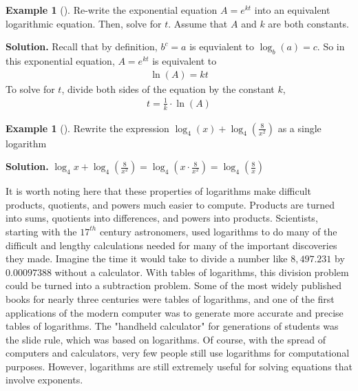 \documentclass[10pt,]{book}
\theoremstyle{plain}
\theoremstyle{definition}
\theoremstyle{definition}
\newtheorem{example}[theorem]{Example}
\theoremstyle{definition}
\numberwithin{equation}{section}
\begin{document}
\begin{example}[]\label{example-22}
\hypertarget{p-292}{}%
Re-write the exponential equation \(A = e^{kt}\) into an equivalent logarithmic equation. Then, solve for \(t\). Assume that \(A\) and \(k\) are both constants.%
\par\smallskip%
\noindent\textbf{Solution.}\hypertarget{solution-22}{}\quad%
\hypertarget{p-293}{}%
Recall that by definition, \(b ^ c = a\) is equvialent to \(\log_b(a) = c\). So in this exponential equation, \(A = e^{kt}\) is equivalent to%
\begin{gather*}
\ln \left( A \right) = kt
\end{gather*}
To solve for \(t\), divide both sides of the equation by the constant \(k\),%
\begin{gather*}
t = \frac{1}{k} \cdot \ln \left( A \right)
\end{gather*}
%
\end{example}
\begin{example}[]\label{example-23}
\hypertarget{p-294}{}%
Rewrite the expression \(\log_4(x) + \log_4 \left( \frac{8}{x^2} \right)\) as a single logarithm%
\par\smallskip%
\noindent\textbf{Solution.}\hypertarget{solution-23}{}\quad%
\hypertarget{p-295}{}%
\(\log_4 x + \log_4 \left( \frac{8}{x^2} \right) = \log_4 \left( x \cdot \frac{8}{x^2} \right) = \log_4 \left( \frac{8}{x} \right)\)%
\end{example}
\hypertarget{p-296}{}%
It is worth noting here that these properties of logarithms make difficult products, quotients, and powers much easier to compute.  Products are turned into sums, quotients into differences, and powers into products.  Scientists, starting with the \(17^{th}\) century astronomers, used logarithms to do many of the difficult and lengthy calculations needed for many of the important discoveries they made.  Imagine the time it would take to divide a number like \(8,497.231\) by \(0.00097388\) without a calculator.  With tables of logarithms, this division problem could be turned into a subtraction problem.  Some of the most widely published books for nearly three centuries were tables of logarithms, and one of the first applications of the modern computer was to generate more accurate and precise tables of logarithms.  The "handheld calculator" for generations of students was the slide rule, which was based on logarithms.  Of course, with the spread of computers and calculators, very few people still use logarithms for computational purposes. However, logarithms are still extremely useful for solving equations that involve exponents.%
\typeout{************************************************}
\typeout{************************************************}
\end{document}
